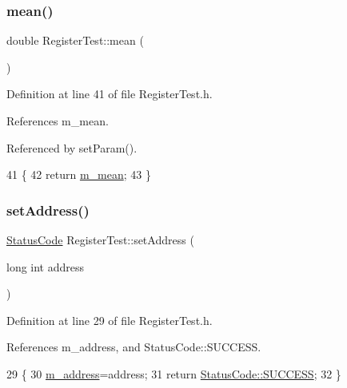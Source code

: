 \subsubsection{\texorpdfstring{mean()}{mean()}}
{\footnotesize\ttfamily double Register\+Test\+::mean (\begin{DoxyParamCaption}{ }\end{DoxyParamCaption})\hspace{0.3cm}{\ttfamily [inline]}}



Definition at line 41 of file Register\+Test.\+h.



References m\+\_\+mean.



Referenced by set\+Param().


\begin{DoxyCode}
41                \{
42     \textcolor{keywordflow}{return} \hyperlink{classRegisterTest_aba5ac8088017236617d2244fc0c261b9}{m\_mean};
43   \}
\end{DoxyCode}
\mbox{\label{classRegisterTest_a5ed3012183069fb4c76580efcf4cec3a}} 
\subsubsection{\texorpdfstring{set\+Address()}{setAddress()}}
{\footnotesize\ttfamily \hyperlink{classStatusCode}{Status\+Code} Register\+Test\+::set\+Address (\begin{DoxyParamCaption}\item[{long int}]{address }\end{DoxyParamCaption})\hspace{0.3cm}{\ttfamily [inline]}}



Definition at line 29 of file Register\+Test.\+h.



References m\+\_\+address, and Status\+Code\+::\+S\+U\+C\+C\+E\+SS.


\begin{DoxyCode}
29                                            \{
30     \hyperlink{classRegisterTest_a1a227f5fe12e8cfc284a904bb9f7e109}{m\_address}=address;
31     \textcolor{keywordflow}{return} \hyperlink{classStatusCode_a6f565cbeadc76d14c72f047e5e85eb4badd0da38d3ba0d922efd1f4619bc37ad8}{StatusCode::SUCCESS};
32   \}
\end{DoxyCode}
\mbox{\label{classRegisterTest_ac2c7c3721a238161d300bf1df5ffb1a5}} 
